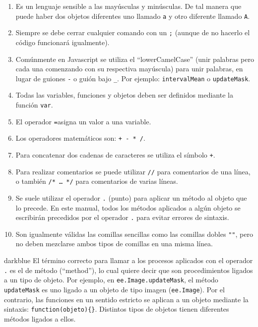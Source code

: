 \documentclass[
  12pt,
  letterpaper,
  twoside]{book}
\providecommand{\tightlist}{%
  \setlength{\itemsep}{0pt}\setlength{\parskip}{0pt}}
\begin{document}
\begin{enumerate}
\def\labelenumi{\arabic{enumi}.}
\tightlist
\item
  Es un lenguaje sensible a las mayúsculas y minúsculas. De tal manera que puede haber dos objetos diferentes uno llamado \texttt{a} y otro diferente llamado \texttt{A}.
\item
  Siempre se debe cerrar cualquier comando con un \texttt{;} (aunque de no hacerlo el código funcionará igualmente).
\item
  Comúnmente en Javascript se utiliza el ``lowerCamelCase'' (unir palabras pero cada una comenzando con su respectiva mayúscula) para unir palabras, en lugar de guiones \texttt{-} o guión bajo \texttt{\_}. Por ejemplo: \texttt{intervalMean} o \texttt{updateMask}.
\item
  Todas las variables, funciones y objetos deben ser definidos mediante la función \texttt{var}.
\item
  El operador \texttt{=}asigna un valor a una variable.
\item
  Los operadores matemáticos son: \texttt{+\ -\ *\ /}.
\item
  Para concatenar dos cadenas de caracteres se utiliza el símbolo \texttt{+}.
\item
  Para realizar comentarios se puede utilizar \texttt{//} para comentarios de una línea, o también \texttt{/*\ \ldots{}\ */} para comentarios de varias líneas.
\item
  Se suele utilizar el operador \texttt{.} (punto) para aplicar un método al objeto que lo precede. En este manual, todos los métodos aplicados a algún objeto se escribirán precedidos por el operador \texttt{.} para evitar errores de sintaxis.
\item
  Son igualmente válidas las comillas sencillas \texttt{\textquotesingle{}\textquotesingle{}} como las comillas dobles \texttt{""}, pero no deben mezclarse ambos tipos de comillas en una misma línea.
\end{enumerate}

\begin{bluebox2}

\begin{awesomeblock}{5pt}{\faLightbulb}{darkblue}
El término correcto para llamar a los procesos aplicados con el operador \texttt{.} es el de método (``method''), lo cual quiere decir que son procedimientos ligados a un tipo de objeto. Por ejemplo, en \texttt{ee.Image.updateMask}, el método \texttt{updateMask} es uno ligado a un objeto de tipo imagen (\texttt{ee.Image}). Por el contrario, las funciones en un sentido estricto se aplican a un objeto mediante la sintaxis: \texttt{function(objeto)\{\}}. Distintos tipos de objetos tienen diferentes métodos ligados a ellos.

\end{awesomeblock}

\end{bluebox2}
\end{document}

